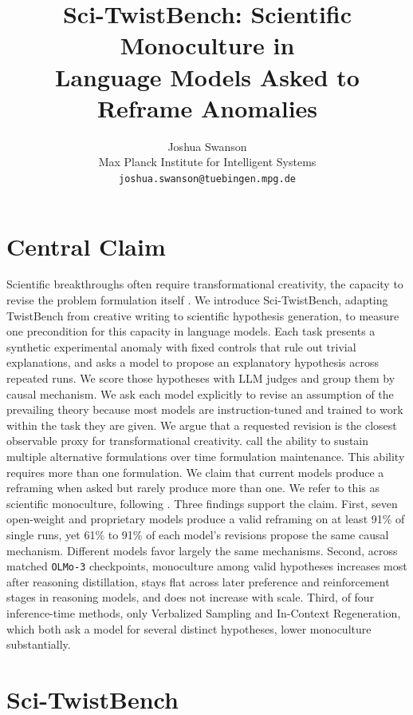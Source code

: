 \documentclass{article}
\title{Sci-TwistBench: Scientific Monoculture in \\ Language Models Asked to \\ Reframe Anomalies}
\author{Joshua Swanson \\
Max Planck Institute for Intelligent Systems \\
\texttt{joshua.swanson@tuebingen.mpg.de}
}
\begin{document}
\maketitle
{}

\section{Central Claim}
\label{sec:claim}

Scientific breakthroughs often require transformational creativity, the capacity to revise the problem formulation itself \citep{vanderschaar2026creativity}. We introduce Sci-TwistBench, adapting TwistBench from creative writing to scientific hypothesis generation, to measure one precondition for this capacity in language models. Each task presents a synthetic experimental anomaly with fixed controls that rule out trivial explanations, and asks a model to propose an explanatory hypothesis across repeated runs. We score those hypotheses with LLM judges and group them by causal mechanism. We ask each model explicitly to revise an assumption of the prevailing theory because most models are instruction-tuned and trained to work within the task they are given. We argue that a requested revision is the closest observable proxy for transformational creativity. \citet{vanderschaar2026creativity} call the ability to sustain multiple alternative formulations over time formulation maintenance. This ability requires more than one formulation. We claim that current models produce a reframing when asked but rarely produce more than one. We refer to this as scientific monoculture, following \citet{traberg2026monoculture}. Three findings support the claim. First, seven open-weight and proprietary models produce a valid reframing on at least 91\% of single runs, yet 61\% to 91\% of each model's revisions propose the same causal mechanism. Different models favor largely the same mechanisms. Second, across matched \texttt{OLMo-3} checkpoints, monoculture among valid hypotheses increases most after reasoning distillation, stays flat across later preference and reinforcement stages in reasoning models, and does not increase with scale. Third, of four inference-time methods, only Verbalized Sampling and In-Context Regeneration, which both ask a model for several distinct hypotheses, lower monoculture substantially.

\section{Sci-TwistBench}
\label{sec:benchmark}
\end{document}
